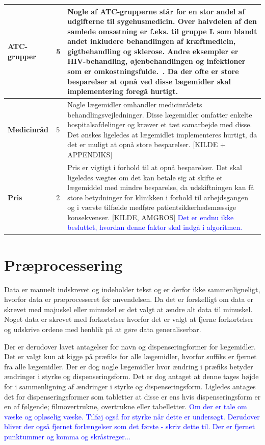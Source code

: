 \begin{longtable}{p{3.5cm}| p{1cm} | p{9.5cm}}
\textbf{ATC-grupper} & 5 & Nogle af ATC-grupperne står for en stor andel af udgifterne til sygehusmedicin. Over halvdelen af den samlede omsætning er f.eks. til gruppe L som blandt andet inkludere behandlingen af kræftmedicin, gigtbehandling og sklerose. Andre eksempler er HIV-behandling, øjenbehandlingen og infektioner som er omkostningsfulde.~\citep{Rapport2009}.  Da der ofte er store besparelser at opnå ved disse lægemidler skal implementering foregå hurtigt. \\ \hline 
\textbf{Medicinråd} & 5 & Nogle lægemidler omhandler medicinrådets behandlingsvejledninger. Disse lægemidler omfatter enkelte hospitalsafdelinger og kræver et tæt samarbejde med disse. Det ønskes ligeledes at lægemidlet implementeres hurtigt, da det er muligt at opnå store besparelser. [KILDE + APPENDIKS]\\ \hline 
\textbf{Pris} &  2 & Pris er vigtigt i forhold til at opnå besparelser. Det skal ligeledes vægtes om det kan betale sig at skifte et lægemiddel med mindre besparelse, da udskiftningen kan få store betydninger for klinikken i forhold til arbejdsgangen og i værste tilfælde medføre patientsikkerhedsmæssige konsekvenser. [KILDE, AMGROS] \textcolor{blue}{Det er endnu ikke besluttet, hvordan denne faktor skal indgå i algoritmen.} \\ \hline
    \end{longtable}

\section{Præprocessering}
Data er manuelt indskrevet og indeholder tekst og er derfor ikke sammenligneligt, hvorfor data er præprocesseret før anvendelsen. Da det er forskelligt om data er skrevet med majuskel eller minuskel er det valgt at ændre alt data til minuskel. Noget data er skrevet med forkortelser hvorfor det er valgt at fjerne forkortelser og udskrive ordene med henblik på at gøre data generaliserbar. 

Der er derudover lavet antagelser for navn og dispenseringformer for lægemidler. Det er valgt kun at kigge på præfiks for alle lægemidler, hvorfor suffiks er fjernet fra alle lægemidler. Der er dog nogle lægemidler  hvor ændring i præfiks betyder ændringer i styrke og dispenseringsform. Det er dog antaget at denne tages højde for i sammenligning af ændringer i styrke og dispenseringsform. Ligledes antages det for dispenseringsformer som tabletter at disse er ens hvis dispenseringsform er en af følgende; filmovertrukne, overtrukne eller  tabelletter. \textcolor{blue}{Om der er tale om væske og opløselig væske. Tilføj også for styrke når dette er undersøgt. Derudover bliver der også fjernet forlængelser som det første - skriv dette til. Der er fjernet punktummer og komma og skråstreger...}

